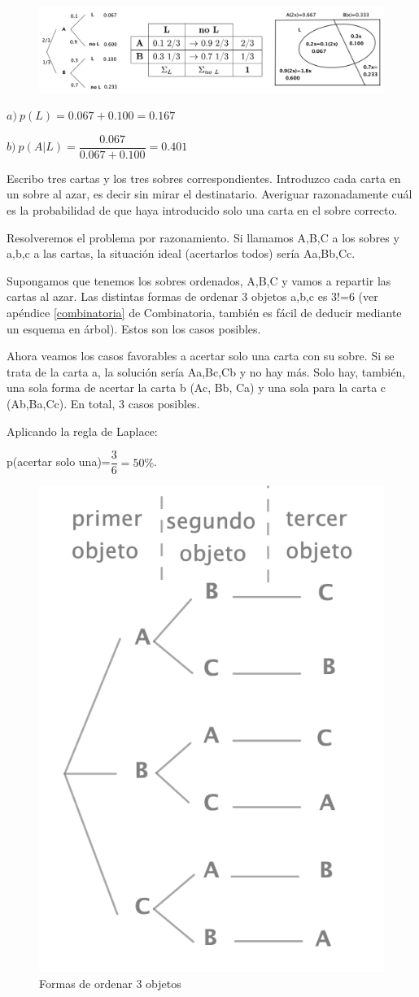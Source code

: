 	\begin{figure}[H]
				\centering
			\includegraphics[width=1\textwidth]{imagenes/imagenes02/T02IM30.png}
	\end{figure}

$a)\ p(L)=0.067+0.100=0.167$

$b)\ p(A|L)=\dfrac{0.067}{0.067+0.100}=0.401$



\vspace{5mm}
\begin{ejemplo}
\begin{ejer}
Escribo tres cartas y los tres sobres correspondientes. Introduzco cada carta en un sobre al azar, es decir sin mirar el destinatario. Averiguar razonadamente cuál es la probabilidad de que haya introducido solo una carta en el sobre correcto.	
\end{ejer}
\end{ejemplo}
Resolveremos el problema por razonamiento. Si llamamos A,B,C a los sobres y a,b,c a las cartas, la situación ideal (acertarlos todos) sería  Aa,Bb,Cc.

\begin{multicols}{2}
Supongamos que tenemos los sobres ordenados, A,B,C y vamos a repartir las cartas al azar. Las distintas formas de ordenar 3 objetos a,b,c es 3!=6 (ver apéndice \ref{combinatoria} de Combinatoria, también es fácil de deducir mediante un esquema en árbol). Estos son los casos posibles.

Ahora veamos los casos favorables a acertar solo una carta con su sobre. Si se trata de la carta a, la solución sería Aa,Bc,Cb y no hay más. Solo hay, también, una sola forma de acertar la carta b (Ac, Bb, Ca) y una sola para la carta c (Ab,Ba,Cc). En total, 3 casos posibles.

Aplicando la regla de Laplace:  

\hspace{1cm} p(acertar solo una)=$\dfrac 3 6 =50\%$.

	\begin{figure}[H]
				\centering
			\includegraphics[width=.3\textwidth]{imagenes/imagenes02/T02IM31.png}
	\caption*{\footnotesize{Formas de ordenar 3 objetos}}
	\end{figure}	
\end{multicols}

